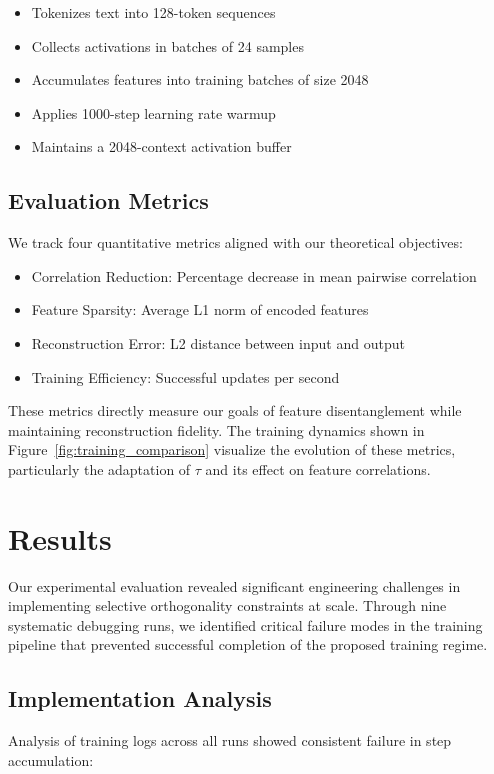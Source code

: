 \documentclass{article} %
\begin{document}
\begin{itemize}
    \item Tokenizes text into 128-token sequences
    \item Collects activations in batches of 24 samples
    \item Accumulates features into training batches of size 2048
    \item Applies 1000-step learning rate warmup
    \item Maintains a 2048-context activation buffer
\end{itemize}

\subsection{Evaluation Metrics}
We track four quantitative metrics aligned with our theoretical objectives:

\begin{itemize}
    \item Correlation Reduction: Percentage decrease in mean pairwise correlation
    \item Feature Sparsity: Average L1 norm of encoded features
    \item Reconstruction Error: L2 distance between input and output
    \item Training Efficiency: Successful updates per second
\end{itemize}

These metrics directly measure our goals of feature disentanglement while maintaining reconstruction fidelity. The training dynamics shown in Figure~\ref{fig:training_comparison} visualize the evolution of these metrics, particularly the adaptation of $\tau$ and its effect on feature correlations.

\section{Results}
\label{sec:results}

Our experimental evaluation revealed significant engineering challenges in implementing selective orthogonality constraints at scale. Through nine systematic debugging runs, we identified critical failure modes in the training pipeline that prevented successful completion of the proposed training regime.

\subsection{Implementation Analysis}
Analysis of training logs across all runs showed consistent failure in step accumulation:
\end{document}
